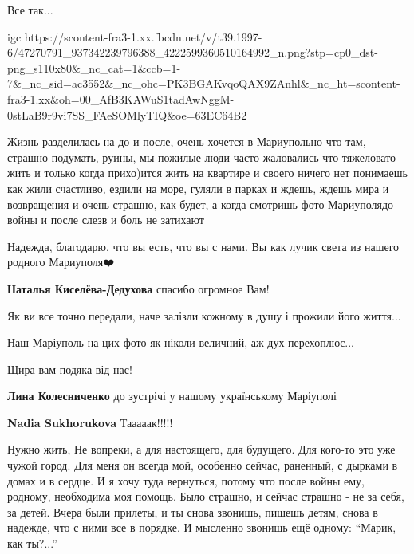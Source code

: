 
Все так...


\ifcmt
  igc https://scontent-fra3-1.xx.fbcdn.net/v/t39.1997-6/47270791_937342239796388_4222599360510164992_n.png?stp=cp0_dst-png_s110x80&_nc_cat=1&ccb=1-7&_nc_sid=ac3552&_nc_ohc=PK3BGAKvqoQAX9ZAnhl&_nc_ht=scontent-fra3-1.xx&oh=00_AfB3KAWuS1tadAwNggM-0stLaB9r9vi7SS_FAeSOMlyTIQ&oe=63EC64B2
\fi


Жизнь разделилась на до и после, очень хочется в Мариупольно что там, страшно
подумать, руины, мы пожилые люди часто жаловались что тяжеловато жить и только
когда прихо)ится жить на квартире и своего ничего нет понимаешь как жили
счастливо, ездили на море, гуляли в парках и ждешь, ждешь мира и возвращения и
очень страшно, как будет, а когда смотришь фото Мариуполядо войны и после слезв
и боль не затихают


Надежда, благодарю, что вы есть, что вы с нами. Вы как лучик света из нашего родного Мариуполя❤️

\begin{itemize} %
\textbf{Наталья Киселёва-Дедухова} спасибо огромное Вам!
\end{itemize} %


Як ви все точно передали, наче залізли кожному в душу і прожили його життя...

Наш Маріуполь на цих фото як ніколи величний, аж дух перехоплює...

Щира вам подяка від нас!

\begin{itemize} %
\textbf{Лина Колесниченко} до зустрічі у нашому українському Маріуполі

\textbf{Nadia Sukhorukova} Тааааак!!!!!
\end{itemize} %


Нужно жить, Не вопреки, а для настоящего, для будущего. Для кого-то это уже
чужой город. Для меня он всегда мой, особенно сейчас, раненный, с дырками в
домах и в сердце. И я хочу туда вернуться, потому что после войны ему, родному,
необходима моя помощь. Было страшно, и сейчас страшно - не за себя, за детей.
Вчера были прилеты, и ты снова звонишь, пишешь детям, снова в надежде, что с
ними все в порядке. И мысленно звонишь ещё одному: \enquote{Марик, как ты?...}

